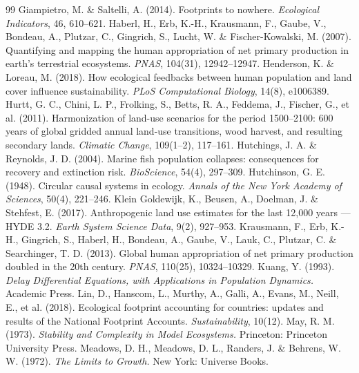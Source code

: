 \begin{thebibliography}{99}
 Giampietro, M. \& Saltelli, A. (2014). Footprints to nowhere. \emph{Ecological Indicators}, 46, 610--621.
 Haberl, H., Erb, K.-H., Krausmann, F., Gaube, V., Bondeau, A., Plutzar, C., Gingrich, S., Lucht, W. \& Fischer-Kowalski, M. (2007). Quantifying and mapping the human appropriation of net primary production in earth's terrestrial ecosystems. \emph{PNAS}, 104(31), 12942--12947.
 Henderson, K. \& Loreau, M. (2018). How ecological feedbacks between human population and land cover influence sustainability. \emph{PLoS Computational Biology}, 14(8), e1006389.
 Hurtt, G. C., Chini, L. P., Frolking, S., Betts, R. A., Feddema, J., Fischer, G., et al. (2011). Harmonization of land-use scenarios for the period 1500--2100: 600 years of global gridded annual land-use transitions, wood harvest, and resulting secondary lands. \emph{Climatic Change}, 109(1--2), 117--161.
 Hutchings, J. A. \& Reynolds, J. D. (2004). Marine fish population collapses: consequences for recovery and extinction risk. \emph{BioScience}, 54(4), 297--309.
 Hutchinson, G. E. (1948). Circular causal systems in ecology. \emph{Annals of the New York Academy of Sciences}, 50(4), 221--246.
 Klein Goldewijk, K., Beusen, A., Doelman, J. \& Stehfest, E. (2017). Anthropogenic land use estimates for the last 12,000 years --- HYDE 3.2. \emph{Earth System Science Data}, 9(2), 927--953.
 Krausmann, F., Erb, K.-H., Gingrich, S., Haberl, H., Bondeau, A., Gaube, V., Lauk, C., Plutzar, C. \& Searchinger, T. D. (2013). Global human appropriation of net primary production doubled in the 20th century. \emph{PNAS}, 110(25), 10324--10329.
 Kuang, Y. (1993). \emph{Delay Differential Equations, with Applications in Population Dynamics.} Academic Press.
 Lin, D., Hanscom, L., Murthy, A., Galli, A., Evans, M., Neill, E., et al. (2018). Ecological footprint accounting for countries: updates and results of the National Footprint Accounts. \emph{Sustainability}, 10(12).
 May, R. M. (1973). \emph{Stability and Complexity in Model Ecosystems.} Princeton: Princeton University Press.
 Meadows, D. H., Meadows, D. L., Randers, J. \& Behrens, W. W. (1972). \emph{The Limits to Growth.} New York: Universe Books.

\end{thebibliography}
